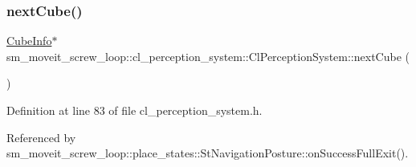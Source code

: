 \subsubsection{\texorpdfstring{next\+Cube()}{nextCube()}}
{\footnotesize\ttfamily \hyperlink{structsm__moveit__screw__loop_1_1cl__perception__system_1_1CubeInfo}{Cube\+Info}$\ast$ sm\+\_\+moveit\+\_\+screw\+\_\+loop\+::cl\+\_\+perception\+\_\+system\+::\+Cl\+Perception\+System\+::next\+Cube (\begin{DoxyParamCaption}{ }\end{DoxyParamCaption})\hspace{0.3cm}{\ttfamily [inline]}}



Definition at line 83 of file cl\+\_\+perception\+\_\+system.\+h.



Referenced by sm\+\_\+moveit\+\_\+screw\+\_\+loop\+::place\+\_\+states\+::\+St\+Navigation\+Posture\+::on\+Success\+Full\+Exit().


